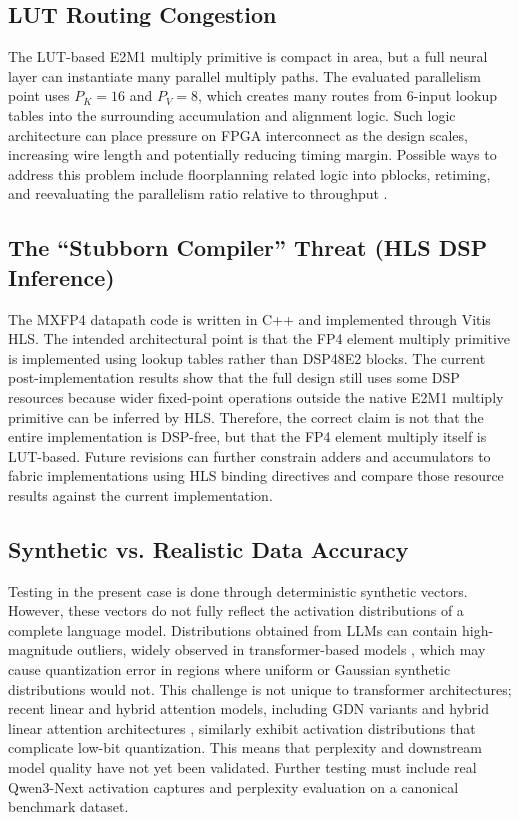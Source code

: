 ﻿\documentclass[conference]{IEEEtran}
\begin{document}
\subsection{LUT Routing Congestion}
The LUT-based E2M1 multiply primitive is compact in area, but a full neural layer can instantiate many parallel multiply paths. The evaluated parallelism point uses $P_K=16$ and $P_V=8$, which creates many routes from 6-input lookup tables into the surrounding accumulation and alignment logic. Such logic architecture can place pressure on FPGA interconnect as the design scales, increasing wire length and potentially reducing timing margin. Possible ways to address this problem include floorplanning related logic into pblocks, retiming, and reevaluating the parallelism ratio relative to throughput \cite{b10}.

\subsection{The ``Stubborn Compiler'' Threat (HLS DSP Inference)}
The MXFP4 datapath code is written in C++ and implemented through Vitis HLS. The intended architectural point is that the FP4 element multiply primitive is implemented using lookup tables rather than DSP48E2 blocks. The current post-implementation results show that the full design still uses some DSP resources because wider fixed-point operations outside the native E2M1 multiply primitive can be inferred by HLS. Therefore, the correct claim is not that the entire implementation is DSP-free, but that the FP4 element multiply itself is LUT-based. Future revisions can further constrain adders and accumulators to fabric implementations using HLS binding directives and compare those resource results against the current implementation.

\subsection{Synthetic vs. Realistic Data Accuracy}
Testing in the present case is done through deterministic synthetic vectors. However, these vectors do not fully reflect the activation distributions of a complete language model. Distributions obtained from LLMs can contain high-magnitude outliers, widely observed in transformer-based models \cite{b2}, which may cause quantization error in regions where uniform or Gaussian synthetic distributions would not. This challenge is not unique to transformer architectures; recent linear and hybrid attention models, including GDN variants \cite{b3} and hybrid linear attention architectures \cite{b8}, similarly exhibit activation distributions that complicate low-bit quantization. This means that perplexity and downstream model quality have not yet been validated. Further testing must include real Qwen3-Next activation captures and perplexity evaluation on a canonical benchmark dataset.
\end{document}
